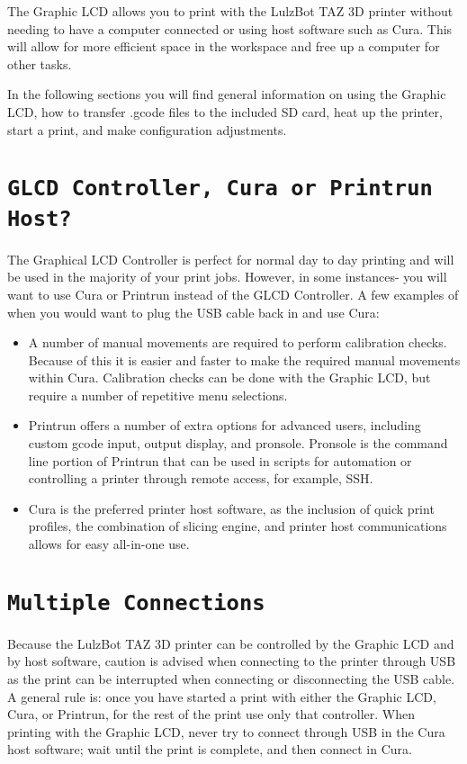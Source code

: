 %
%
%
%
%

The Graphic LCD allows you to print with the LulzBot\textsuperscript{\miniscule{\textregistered}} TAZ 3D printer without needing to have a computer connected or using host software such as Cura. This will allow for more efficient space in the workspace and free up a computer for other tasks.

In the following sections you will find general information on using the Graphic LCD, how to transfer .gcode files to the included SD card, heat up the printer, start a print, and make configuration adjustments.

\section{\texttt{GLCD Controller, Cura or Printrun Host?}}
\label{sec:Graphic LCD, Cura or Printrun Host?}
The Graphical LCD Controller is perfect for normal day to day printing and will be used in the majority of your print jobs. However, in some instances- you will want to use Cura or Printrun instead of the GLCD Controller. A few examples of when you would want to plug the USB cable back in and use Cura:
\begin{itemize}
	\item A number of manual movements are required to perform calibration checks. Because of this it is easier and faster to make the required manual movements within Cura. Calibration checks can be done with the Graphic LCD, but require a number of repetitive menu selections.
	\item Printrun offers a number of extra options for advanced users, including custom gcode input, output display, and pronsole. Pronsole is the command line portion of Printrun that can be used in scripts for automation or controlling a printer through remote access, for example, SSH.
	\item Cura is the preferred printer host software, as the inclusion of quick print profiles, the combination of slicing engine, and printer host communications allows for easy all-in-one use.
\end{itemize}

\section{\texttt{Multiple Connections}}
Because the LulzBot TAZ 3D printer can be controlled by the Graphic LCD and by host software, caution is advised when connecting to the printer through USB as the print can be interrupted when connecting or disconnecting the USB cable. A general rule is: once you have started a print with either the Graphic LCD, Cura, or Printrun, for the rest of the print use only that controller. When printing with the Graphic LCD, never try to connect through USB in the Cura host software; wait until the print is complete, and then connect in Cura.

